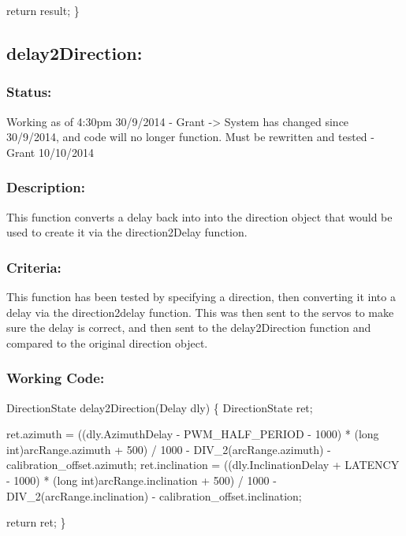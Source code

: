 \documentclass[]{report}
\begin{document}
	return result;\newline
\}\newline

\subsection{delay2Direction:}
\subsubsection{Status:}
Working as of 4:30pm 30/9/2014 - Grant -> System has changed since 30/9/2014, and code will no longer function. Must be rewritten and tested - Grant 10/10/2014

\subsubsection{Description:}
This function converts a delay back into into the direction object that would be used to create it via the direction2Delay function.

\subsubsection{Criteria:}
This function has been tested by specifying a direction, then converting it into a delay via the direction2delay function. This was then sent to the servos to make sure the delay is correct, and then sent to the delay2Direction function and compared to the original direction object.

\subsubsection{Working Code:}
DirectionState delay2Direction(Delay dly) \newline
\{ \newline
	DirectionState ret; \newline
	
	ret.azimuth = ((dly.AzimuthDelay - PWM\_HALF\_PERIOD - 1000) * (long int)arcRange.azimuth + 500) / 1000 - DIV\_2(arcRange.azimuth) - calibration\_offset.azimuth; \newline
	ret.inclination = ((dly.InclinationDelay + LATENCY - 1000) * (long int)arcRange.inclination + 500) / 1000 - DIV\_2(arcRange.inclination) - calibration\_offset.inclination; \newline
	
	return ret; \newline
\} \newline
\end{document}
